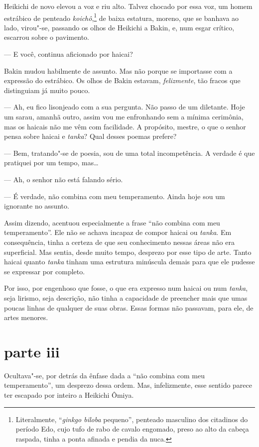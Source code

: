 Heikichi de novo elevou a voz e riu alto. Talvez chocado por essa voz,
um homem estrábico de penteado \textit{koichô},\footnote{ Literalmente, 
``\textit{ginkgo biloba} pequeno'', penteado masculino dos citadinos 
do período Edo, cujo tufo de rabo de cavalo engomado, preso ao alto da cabeça raspada, 
tinha a ponta afinada e pendia da nuca.} de baixa estatura,
moreno, que se banhava ao lado, virou"-se, passando os olhos de Heikichi
a Bakin, e, num esgar crítico, escarrou sobre o pavimento.

--- E você, continua aficionado por haicai?

Bakin mudou habilmente de assunto. Mas não porque se importasse com a
expressão do estrábico. Os olhos de Bakin estavam,
\textit{felizmente}, tão fracos que distinguiam já muito pouco.

--- Ah, eu fico lisonjeado com a sua pergunta. Não passo de um diletante.
Hoje um sarau, amanhã outro, assim vou me enfronhando sem a mínima
cerimônia, mas os haicais não me vêm com facilidade. 
A propósito, mestre, o que o senhor pensa
sobre haicai e \textit{tanka}? Qual desses poemas prefere?

--- Bem, tratando"-se de poesia, sou de uma total incompetência. A verdade
é que pratiquei por um tempo, mas\ldots{}

--- Ah, o senhor não está falando sério.

--- É verdade, não combina com meu temperamento. Ainda hoje sou um
ignorante no assunto.

Assim dizendo, acentuou especialmente a frase ``não combina com meu
temperamento''. Ele não se achava incapaz de compor haicai ou
\textit{tanka}. Em consequência, tinha a certeza de que seu
conhecimento nessas áreas não era superficial. Mas sentia, desde muito
tempo, desprezo por esse tipo de arte. Tanto haicai quanto
\textit{tanka} tinham uma estrutura minúscula demais para que ele
pudesse se expressar por completo.

Por isso, por engenhoso que fosse, o que era expresso num haicai ou num
\textit{tanka}, seja lirismo, seja descrição, não tinha a capacidade de
preencher mais que umas poucas linhas de qualquer de suas obras. Essas
formas não passavam, para ele, de artes menores.

\section*{parte iii}

Ocultava"-se, por detrás da ênfase dada a ``não combina com meu
temperamento'', um desprezo dessa ordem. Mas, infelizmente, esse sentido
parece ter escapado por inteiro a Heikichi Ômiya.

